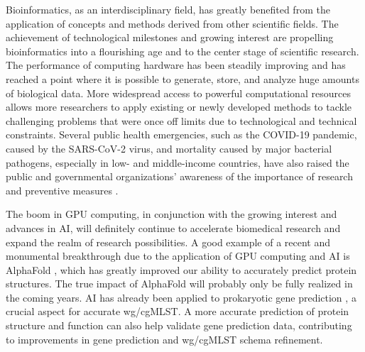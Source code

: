 Bioinformatics, as an interdisciplinary field, has greatly benefited from the application of concepts and methods derived from other scientific fields. The achievement of technological milestones and growing interest are propelling bioinformatics into a flourishing age and to the center stage of scientific research. The performance of computing hardware has been steadily improving and has reached a point where it is possible to generate, store, and analyze huge amounts of biological data. More widespread access to powerful computational resources allows more researchers to apply existing or newly developed methods to tackle challenging problems that were once off limits due to technological and technical constraints. Several public health emergencies, such as the COVID-19 pandemic, caused by the SARS-CoV-2 virus, and mortality caused by major bacterial pathogens, especially in low- and middle-income countries, have also raised the public and governmental organizations' awareness of the importance of research and preventive measures \cite{ikuta_global_2022}.

The boom in \ac{GPU} computing, in conjunction with the growing interest and advances in \ac{AI}, will definitely continue to accelerate biomedical research and expand the realm of research possibilities. A good example of a recent and monumental breakthrough due to the application of \ac{GPU} computing and \ac{AI} is AlphaFold \cite{jumper_highly_2021, abramson_accurate_2024}, which has greatly improved our ability to accurately predict protein structures. The true impact of AlphaFold will probably only be fully realized in the coming years. \ac{AI} has already been applied to prokaryotic gene prediction \cite{sommer_balrog_2021}, a crucial aspect for accurate \ac{wg/cgMLST}. A more accurate prediction of protein structure and function can also help validate gene prediction data, contributing to improvements in gene prediction and \ac{wg/cgMLST} schema refinement.

